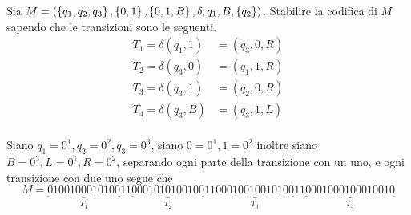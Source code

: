 \documentclass{subfiles}
\begin{document}
\begin{Example*}
    Sia \(M = (\left\{q_{1}, q_{2}, q_{3}\right\}, \left\{0, 1\right\}, \left\{0, 1, B\right\}, \delta, q_{1}, B, \left\{q_{2}\right\})\). Stabilire la codifica di \(M\) sapendo che le transizioni sono le seguenti.
    \[\begin{aligned}
            T_{1} = \delta(q_{1}, 1) & = (q_{3}, 0, R) \\
            T_{2} = \delta(q_{3}, 0) & = (q_{1}, 1, R) \\
            T_{3} = \delta(q_{3}, 1) & = (q_{2}, 0, R) \\
            T_{4} = \delta(q_{3}, B) & = (q_{3}, 1, L) \\
        \end{aligned}\]
    \begin{Solution*}
        Siano \(q_{1} = 0^{1}, q_{2} = 0^{2}, q_{3} = 0^{3}\), siano \(0 = 0^{1}, 1 = 0^{2}\) inoltre siano \(B = 0^{3}, L = 0^{1}, R = 0^{2}\), separando ogni parte della transizione con un uno,
        e ogni transizione con due uno segue che
        \[
            M = \underbrace{0100100010100}_{T_{1}} 11  \underbrace{0001010100100}_{T_{2}} 11 \underbrace{00010010010100}_{T_{3}} 11 \underbrace{0001000100010010}_{T_{4}}
        \]
    \end{Solution*}
\end{Example*}
\end{document}
